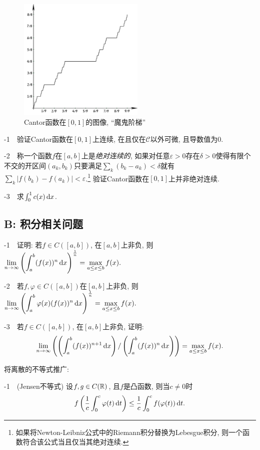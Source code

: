 \begin{figure}[H]
	\centering
	\includegraphics[width=6cm]{attachment/CantorEscalier-2.pdf}
	\caption{Cantor函数在$[0,1]$的图像, “魔鬼阶梯”}
\end{figure}

-1~~验证Cantor函数在$[0,1]$上连续, 在且仅在$\mathcal{C}$以外可微, 且导数值为$0$. 

-2~~称一个函数$f$在$[a,b]$上是\textit{绝对连续的}, 如果对任意$\varepsilon >0$存在$\delta >0$使得有限个不交的开区间$(a_k,b_k)$只要满足$\sum_k (b_k-a_k) <\delta$就有$\sum_k |f(b_k)-f(a_k)|<\varepsilon$.\footnote{如果将Newton-Leibniz公式中的Riemann积分替换为Lebesgue积分, 则一个函数符合该公式当且仅当其绝对连续. } 验证Cantor函数在$[0,1]$上并非绝对连续. 

-3~~求$\int_0^1 c(x) \mathop{}\!\mathrm{d} x$. 
\vspace{1em}

\subsection*{B: 积分相关问题}

-1~~证明: 若$f \in C([a,b])$, 在$[a,b]$上非负, 则$\displaystyle \lim_{n\to \infty} \left( \int_a^b (f(x))^n \mathop{}\!\mathrm{d} x \right)^{\frac{1}{n}} = \max_{a \leq x \leq b} f(x).$

-2~~若$f,\varphi \in C([a,b])$在$[a,b]$上非负, 则$\displaystyle \lim_{n\to \infty} \left( \int_a^b \varphi (x) (f(x))^n \mathop{}\!\mathrm{d} x \right)^{\frac{1}{n}} = \max_{a \leq x \leq b} f(x).$

-3~~若$f \in C([a,b])$, 在$[a,b]$上非负, 证明: $$\lim_{n\to \infty} \left( \left( \int_a^b (f(x))^{n+1} \mathop{}\!\mathrm{d} x \right) / \left( \int_a^b (f(x))^n \mathop{}\!\mathrm{d} x \right) \right) = \max_{a \leq x \leq b} f(x).$$

将离散的不等式推广: 
\vspace{1em}

-1~~(Jensen不等式) 设$f,g \in C(\mathbb{R})$, 且$f$是凸函数, 则当$c \neq 0$时$$f\left( \frac{1}{c} \int_0^c \varphi (t) \mathop{}\!\mathrm{d} t \right) \leq \frac{1}{c} \int_0^c f(\varphi (t)) \mathop{}\!\mathrm{d} t.$$

